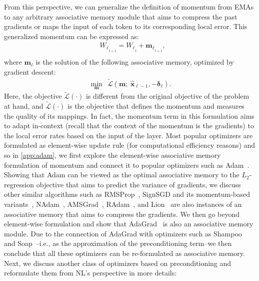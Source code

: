From this perspective, we can generalize the definition of momentum from EMAs to any arbitrary associative memory module that aims to compress the past gradients or maps the input of each token to its corresponding local error. This generalized momentum can be expressed as:
\begin{align}
    &{W_{\ell}}_{_{t+1}} = {W_{\ell}}_{_{t}} + {\boldsymbol{m}_{\ell}}_{_{t+1}}, \\
\end{align}
where $\boldsymbol{m}_{\ell}$ is the solution of the following associative memory, optimized by gradient descent:
\begin{align}
    \min_{\boldsymbol{m}}\:\: \tilde{\mathcal{L}}\left(\boldsymbol{m};  \:\hat{\boldsymbol{x}}_{\ell - 1}, - \boldsymbol{\delta}_{\ell} \right).
\end{align}
Here, the objective $\tilde{\mathcal{L}}(\cdot)$ is different from the original objective of the problem at hand, and $\tilde{\mathcal{L}}(\cdot)$ is the objective that defines the momentum and measures the quality of its mappings. In fact, the momentum term in this formulation aims to adapt in-context (recall that the context of the momentum is the gradients) to the local error rates based on the input of the layer. Most popular optimizers are formulated as element-wise update rule (for computational efficiency reasons) and so in \autoref{app:adam}, we first explore the element-wise associative memory formulation of momentum and connect it to popular optimizers such as Adam~\citep{kingma2014adam}. Showing that Adam can be viewed as the optimal associative memory to the $L_2$-regression objective that aims to predict the variance of gradients, we discuss other similar algorithms such as RMSProp~\citep{hinton2012neural}, SignSGD and its momentum-based variants~\citep{bernstein2018signsgd}, NAdam~\citep{dozat2016incorporating}, AMSGrad~\citep{reddi2016stochastic}, RAdam~\citep{Liu2020On}, and Lion~\citep{chen2023symbolic} are also instances of an associative memory that aims to compress the gradients. We then go beyond element-wise formulation and show that AdaGrad~\citep{duchi2011adaptive} is also an associative memory module. Due to the connection of AdaGrad with optimizers such as Shampoo~\citep{gupta2018shampoo} and Soap~\citep{vyas2025soap}–i.e., as the approximation of the preconditioning term–we then conclude that all these optimizers can be re-formulated as associative memory. Next, we discuss another class of optimizers based on preconditioning and reformulate them from NL's perspective in more details:





